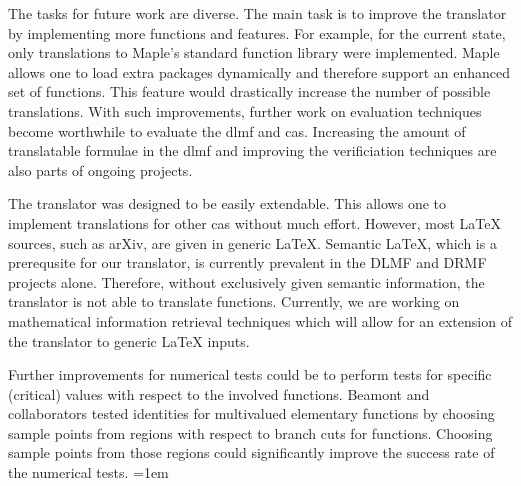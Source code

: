 \documentclass[a4paper,11pt]{article}
\newcommand{\Maple}{Maple}
\theoremstyle{defTheoStyle}
\theoremstyle{defExampStyle}
\begin{document}
The tasks for future work are diverse. The main task is to improve the translator by implementing more functions and features. For example, for the current state, only translations to \Maple's standard function library were implemented. \Maple{} allows one to load extra packages dynamically and therefore support an enhanced set of functions. This feature would drastically increase the number of possible translations. With such improvements, further work on evaluation techniques become worthwhile to evaluate the \gls*{dlmf} and \gls*{cas}.
Increasing the amount of translatable formulae in the \gls*{dlmf} and improving the verificiation 
techniques are also parts of ongoing projects. 

The translator was designed to be easily extendable. This allows one to implement translations for other \gls*{cas} without much effort.
However, most \LaTeX{} sources, such as arXiv, are given in generic \LaTeX{}. Semantic \LaTeX{}, which is a prerequsite for our translator, is currently prevalent in the DLMF and DRMF projects alone. Therefore, without exclusively given semantic information, the translator is not able to translate functions. Currently, we are working on mathematical information retrieval techniques which will allow for an extension of the translator to generic \LaTeX{} inputs.

Further improvements for numerical tests could be to perform tests for specific (critical) values \parencite{DBLP:journals/aaecc/BeaumontBDP07} with respect to the involved functions. Beamont and collaborators tested identities for multivalued elementary functions by choosing sample points from regions with respect to branch cuts for functions. Choosing sample points from those regions could significantly improve the success rate of the numerical tests.
\emergencystretch=1em
\printbibliography

\end{document}
